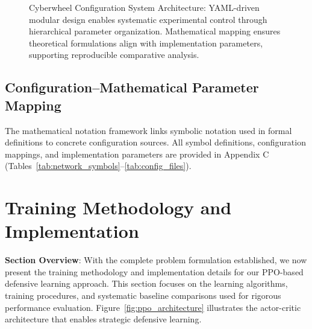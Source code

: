 \documentclass[12pt,oneside]{article}
\begin{document}
\begin{figure}[H]
\caption{Cyberwheel Configuration System Architecture: YAML-driven modular design enables systematic experimental control through hierarchical parameter organization. Mathematical mapping ensures theoretical formulations align with implementation parameters, supporting reproducible comparative analysis.}
\end{figure}

\subsection{Configuration--Mathematical Parameter Mapping}

  The mathematical notation framework links symbolic notation used in formal definitions to concrete configuration sources. All symbol definitions, configuration mappings, and implementation parameters are provided in Appendix C (Tables~\ref{tab:network_symbols}--\ref{tab:config_files}).
\clearpage

\section{Training Methodology and Implementation}

\textbf{Section Overview}: With the complete problem formulation established, we now present the training methodology and implementation details for our PPO-based defensive learning approach. This section focuses on the learning algorithms, training procedures, and systematic baseline comparisons used for rigorous performance evaluation. Figure~\ref{fig:ppo_architecture} illustrates the actor-critic architecture that enables strategic defensive learning.
\end{document}
